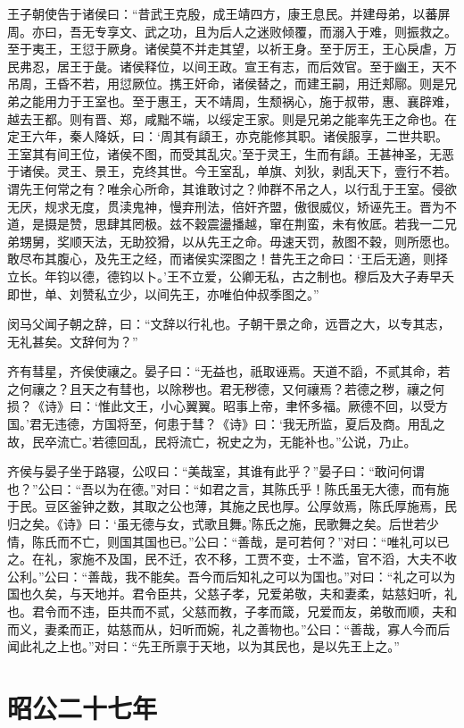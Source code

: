 \documentclass[a4paper,12pt,UTF8,twoside]{ctexbook}
\begin{document}
王子朝使告于诸侯曰：“昔武王克殷，成王靖四方，康王息民。并建母弟，以蕃屏周。亦曰，吾无专享文、武之功，且为后人之迷败倾覆，而溺入于难，则振救之。至于夷王，王愆于厥身。诸侯莫不并走其望，以祈王身。至于厉王，王心戾虐，万民弗忍，居王于彘。诸侯释位，以间王政。宣王有志，而后效官。至于幽王，天不吊周，王昏不若，用愆厥位。携王奸命，诸侯替之，而建王嗣，用迁郏鄏。则是兄弟之能用力于王室也。至于惠王，天不靖周，生颓祸心，施于叔带，惠、襄辟难，越去王都。则有晋、郑，咸黜不端，以绥定王家。则是兄弟之能率先王之命也。在定王六年，秦人降妖，曰：‘周其有頿王，亦克能修其职。诸侯服享，二世共职。王室其有间王位，诸侯不图，而受其乱灾。’至于灵王，生而有頿。王甚神圣，无恶于诸侯。灵王、景王，克终其世。今王室乱，单旗、刘狄，剥乱天下，壹行不若。谓先王何常之有？唯余心所命，其谁敢讨之？帅群不吊之人，以行乱于王室。侵欲无厌，规求无度，贯渎鬼神，慢弃刑法，倍奸齐盟，傲很威仪，矫诬先王。晋为不道，是摄是赞，思肆其罔极。兹不穀震盪播越，窜在荆蛮，未有攸厎。若我一二兄弟甥舅，奖顺天法，无助狡猾，以从先王之命。毋速天罚，赦图不穀，则所愿也。敢尽布其腹心，及先王之经，而诸侯实深图之！昔先王之命曰：‘王后无適，则择立长。年钧以德，德钧以卜。’王不立爱，公卿无私，古之制也。穆后及大子寿早夭即世，单、刘赞私立少，以间先王，亦唯伯仲叔季图之。”

闵马父闻子朝之辞，曰：“文辞以行礼也。子朝干景之命，远晋之大，以专其志，无礼甚矣。文辞何为？”

齐有彗星，齐侯使禳之。晏子曰：“无益也，祇取诬焉。天道不謟，不贰其命，若之何禳之？且天之有彗也，以除秽也。君无秽德，又何禳焉？若德之秽，禳之何损？《诗》曰：‘惟此文王，小心翼翼。昭事上帝，聿怀多福。厥德不回，以受方国。’君无违德，方国将至，何患于彗？《诗》曰：‘我无所监，夏后及商。用乱之故，民卒流亡。’若德回乱，民将流亡，祝史之为，无能补也。”公说，乃止。

齐侯与晏子坐于路寝，公叹曰：“美哉室，其谁有此乎？”晏子曰：“敢问何谓也？”公曰：“吾以为在德。”对曰：“如君之言，其陈氏乎！陈氏虽无大德，而有施于民。豆区釜钟之数，其取之公也薄，其施之民也厚。公厚敛焉，陈氏厚施焉，民归之矣。《诗》曰：‘虽无德与女，式歌且舞。’陈氏之施，民歌舞之矣。后世若少情，陈氏而不亡，则国其国也已。”公曰：“善哉，是可若何？”对曰：“唯礼可以已之。在礼，家施不及国，民不迁，农不移，工贾不变，士不滥，官不滔，大夫不收公利。”公曰：“善哉，我不能矣。吾今而后知礼之可以为国也。”对曰：“礼之可以为国也久矣，与天地并。君令臣共，父慈子孝，兄爱弟敬，夫和妻柔，姑慈妇听，礼也。君令而不违，臣共而不贰，父慈而教，子孝而箴，兄爱而友，弟敬而顺，夫和而义，妻柔而正，姑慈而从，妇听而婉，礼之善物也。”公曰：“善哉，寡人今而后闻此礼之上也。”对曰：“先王所禀于天地，以为其民也，是以先王上之。”


\section{昭公二十七年}
\end{document}
